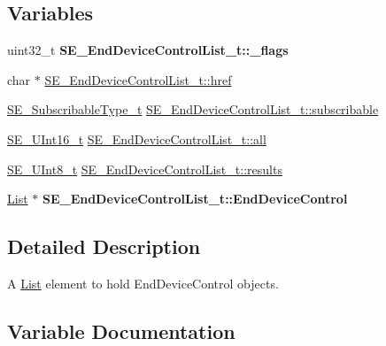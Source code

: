 \subsection*{Variables}
\begin{DoxyCompactItemize}
\item 
\mbox{\label{group__EndDeviceControlList_gae36be604a13f1b75a1e1196a2c2341f2}} 
uint32\+\_\+t {\bfseries S\+E\+\_\+\+End\+Device\+Control\+List\+\_\+t\+::\+\_\+flags}
\item 
char $\ast$ \hyperlink{group__EndDeviceControlList_gac58496760ce23c835d784789fdd5e800}{S\+E\+\_\+\+End\+Device\+Control\+List\+\_\+t\+::href}
\item 
\hyperlink{group__SubscribableType_ga5c41f553d369710ed34619266bf2551e}{S\+E\+\_\+\+Subscribable\+Type\+\_\+t} \hyperlink{group__EndDeviceControlList_ga904fa33399c54c6019f35032add14ab7}{S\+E\+\_\+\+End\+Device\+Control\+List\+\_\+t\+::subscribable}
\item 
\hyperlink{group__UInt16_gac68d541f189538bfd30cfaa712d20d29}{S\+E\+\_\+\+U\+Int16\+\_\+t} \hyperlink{group__EndDeviceControlList_ga0168ebdfbb23cee8d5b69dd8ea3bc6c6}{S\+E\+\_\+\+End\+Device\+Control\+List\+\_\+t\+::all}
\item 
\hyperlink{group__UInt8_gaf7c365a1acfe204e3a67c16ed44572f5}{S\+E\+\_\+\+U\+Int8\+\_\+t} \hyperlink{group__EndDeviceControlList_gaa08c142b0d0d594c9e10a7369d25ad6e}{S\+E\+\_\+\+End\+Device\+Control\+List\+\_\+t\+::results}
\item 
\mbox{\label{group__EndDeviceControlList_gac18b7a455a3dcbf29f52ab9dc9fab48d}} 
\hyperlink{structList}{List} $\ast$ {\bfseries S\+E\+\_\+\+End\+Device\+Control\+List\+\_\+t\+::\+End\+Device\+Control}
\end{DoxyCompactItemize}


\subsection{Detailed Description}
A \hyperlink{structList}{List} element to hold End\+Device\+Control objects. 

\subsection{Variable Documentation}
\mbox{\label{group__EndDeviceControlList_ga0168ebdfbb23cee8d5b69dd8ea3bc6c6}} 
